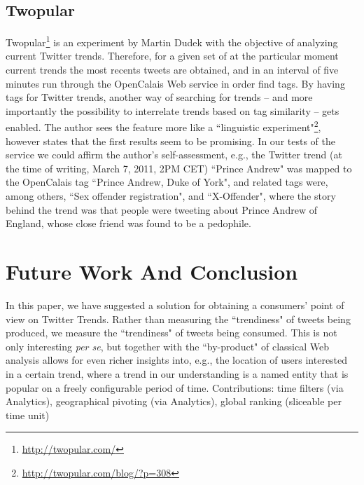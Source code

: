 \documentclass[runningheads,a4paper]{llncs}
\begin{document}
\subsection{Twopular}\label{sec:twopular}
Twopular\footnote{\url{http://twopular.com/}} is an experiment by Martin Dudek with the objective of analyzing current Twitter trends. Therefore, for a given set of at the particular moment current trends the most recents tweets are obtained, and in an interval of five minutes run through the OpenCalais Web service in order find tags. By having tags for Twitter trends, another way of searching for trends -- and more importantly the possibility to interrelate trends based on tag similarity -- gets enabled. The author sees the feature more like a ``linguistic experiment"\footnote{\url{http://twopular.com/blog/?p=308}}, however states that the first results seem to be promising. In our tests of the service we could affirm the author's self-assessment, e.g., the Twitter trend (at the time of writing, March 7, 2011, 2PM CET) ``Prince Andrew" was mapped to the OpenCalais tag ``Prince Andrew, Duke of York", and related tags were, among others,  ``Sex offender registration", and ``X-Offender", where the story behind the trend was that people were tweeting about Prince Andrew of England, whose close friend was found to be a pedophile.

\section{Future Work And Conclusion}\label{sec:conclusion}
In this paper, we have suggested a solution for obtaining a consumers' point of view on Twitter Trends. Rather than measuring the ``trendiness" of tweets being produced, we measure the ``trendiness" of tweets being consumed. This is not only interesting \textit{per se}, but together with the ``by-product" of classical Web analysis allows for even richer insights into, e.g., the location of users interested in a certain trend, where a trend in our understanding is a named entity that is popular on a freely configurable period of time.
Contributions: time filters (via Analytics), geographical pivoting (via Analytics), global ranking (sliceable per time unit)




\end{document}
